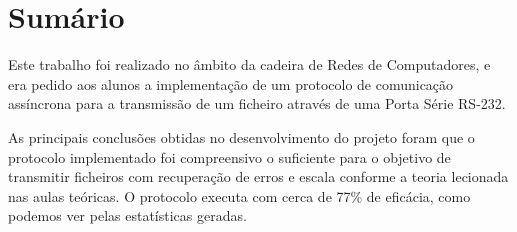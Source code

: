 \documentclass[a4paper, 11pt]{article}
\begin{document}
\maketitle
\thispagestyle{empty}


\newpage

%
%
%
%
%
%
%

\tableofcontents

\newpage

\section{Sumário}
\normalsize 

Este trabalho foi realizado no âmbito da cadeira de Redes de Computadores, e era pedido aos alunos a implementação de um protocolo de comunicação assíncrona para a transmissão de um ficheiro através de uma Porta Série RS-232.

As principais conclusões obtidas no desenvolvimento do projeto foram que o protocolo implementado foi compreensivo o suficiente para o objetivo de transmitir ficheiros com recuperação de erros e escala conforme a teoria lecionada nas aulas teóricas. O protocolo executa com cerca de 77\% de eficácia, como podemos ver pelas estatísticas geradas.
\end{document}
